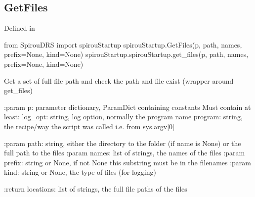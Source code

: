 \noindent\begin{minipage}{\textwidth}
\subsection{GetFiles}

Defined in \spirouStartup{}

\begin{pythonbox}
from SpirouDRS import spirouStartup
spirouStartup.GetFiles(p, path, names, prefix=None, kind=None)
spirouStartup.spirouStartup.get_files(p, path, names, prefix=None, kind=None)
\end{pythonbox}

\begin{pythondocstring}
Get a set of full file path and check the path and file exist
(wrapper around get_files)

:param p: parameter dictionary, ParamDict containing constants
    Must contain at least:
            log_opt: string, log option, normally the program name
            program: string, the recipe/way the script was called
                     i.e. from sys.argv[0]

:param path: string, either the directory to the folder (if name is None) or
             the full path to the files
:param names: list of strings, the names of the files
:param prefix: string or None, if not None this substring must be in the
               filenames
:param kind: string or None, the type of files (for logging)

:return locations: list of strings, the full file paths of the files
\end{pythondocstring}
\end{minipage}




